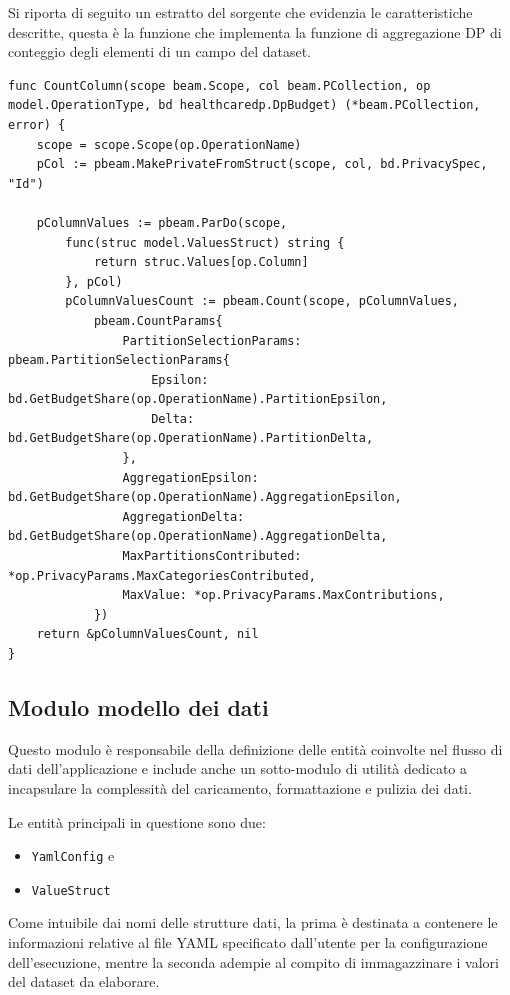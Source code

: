 Si riporta di seguito un estratto del sorgente che evidenzia le caratteristiche descritte, questa è la funzione che implementa la funzione di aggregazione DP di conteggio degli elementi di un campo del dataset.
\begin{verbatim}
func CountColumn(scope beam.Scope, col beam.PCollection, op model.OperationType, bd healthcaredp.DpBudget) (*beam.PCollection, error) {
	scope = scope.Scope(op.OperationName)
	pCol := pbeam.MakePrivateFromStruct(scope, col, bd.PrivacySpec, "Id")

	pColumnValues := pbeam.ParDo(scope,
		func(struc model.ValuesStruct) string {
			return struc.Values[op.Column]
		}, pCol)
        pColumnValuesCount := pbeam.Count(scope, pColumnValues,
            pbeam.CountParams{
                PartitionSelectionParams: pbeam.PartitionSelectionParams{
                    Epsilon: bd.GetBudgetShare(op.OperationName).PartitionEpsilon,
                    Delta:   bd.GetBudgetShare(op.OperationName).PartitionDelta,
                },
                AggregationEpsilon: bd.GetBudgetShare(op.OperationName).AggregationEpsilon,
                AggregationDelta: bd.GetBudgetShare(op.OperationName).AggregationDelta,
                MaxPartitionsContributed: *op.PrivacyParams.MaxCategoriesContributed,
                MaxValue: *op.PrivacyParams.MaxContributions,
            })
	return &pColumnValuesCount, nil
}
\end{verbatim}

\subsection{Modulo modello dei dati}

Questo modulo è responsabile della definizione delle entità coinvolte nel flusso di dati dell'applicazione e include anche un sotto-modulo di utilità dedicato a incapsulare la complessità del caricamento, formattazione e pulizia dei dati.

Le entità principali in questione sono due:
\begin{itemize}
    \item \texttt{YamlConfig} e
    \item \texttt{ValueStruct}
\end{itemize}
Come intuibile dai nomi delle strutture dati, la prima è destinata a contenere le informazioni relative al file YAML specificato dall'utente per la configurazione dell'esecuzione, mentre la seconda adempie al compito di immagazzinare i valori del dataset da elaborare.

